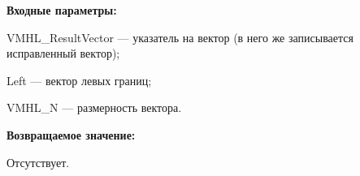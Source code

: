 \textbf{Входные параметры:}  
 
VMHL\_ResultVector --- указатель на вектор (в него же записывается исправленный вектор);
 
Left --- вектор левых границ;
 
VMHL\_N --- размерность вектора.

\textbf{Возвращаемое значение:}

Отсутствует.